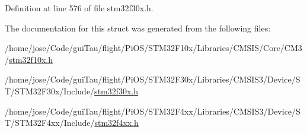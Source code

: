 Definition at line 576 of file stm32f30x.\-h.



The documentation for this struct was generated from the following files\-:\begin{DoxyCompactItemize}
\item 
/home/jose/\-Code/gui\-Tau/flight/\-Pi\-O\-S/\-S\-T\-M32\-F10x/\-Libraries/\-C\-M\-S\-I\-S/\-Core/\-C\-M3/\hyperlink{stm32f10x_8h}{stm32f10x.\-h}\item 
/home/jose/\-Code/gui\-Tau/flight/\-Pi\-O\-S/\-S\-T\-M32\-F30x/\-Libraries/\-C\-M\-S\-I\-S3/\-Device/\-S\-T/\-S\-T\-M32\-F30x/\-Include/\hyperlink{stm32f30x_8h}{stm32f30x.\-h}\item 
/home/jose/\-Code/gui\-Tau/flight/\-Pi\-O\-S/\-S\-T\-M32\-F4xx/\-Libraries/\-C\-M\-S\-I\-S3/\-Device/\-S\-T/\-S\-T\-M32\-F4xx/\-Include/\hyperlink{stm32f4xx_8h}{stm32f4xx.\-h}\end{DoxyCompactItemize}
